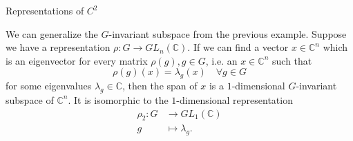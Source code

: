 \begin{frame}{Representations of ${C}^2$}
\end{frame}

\begin{frame}
\begin{example}
We can generalize the $G$-invariant subspace from the previous example.  Suppose we have a representation $\rho \colon G
\to GL_n
(\mathbb{C})$.  If
we can find a vector $x \in \mathbb{C}^n$ which is an eigenvector for every matrix $\rho(g), g \in G$,
i.e. an $x \in \mathbb{C}^n$ such that
\[ \rho(g) (x) = \lambda_g (x) \quad \forall g \in G\]
for some eigenvalues $\lambda_g \in \mathbb{C}$, then the span of $x$ is a $1$-dimensional $G$-invariant
subspace
 of $\mathbb{C}^n$.  It is isomorphic to the $1$-dimensional representation
\begin{align*}
 \rho_2 \colon G &\to GL_1 (\mathbb{C}) \\
g &\mapsto \lambda_g.
\end{align*}
\end{example}
\end{frame}

